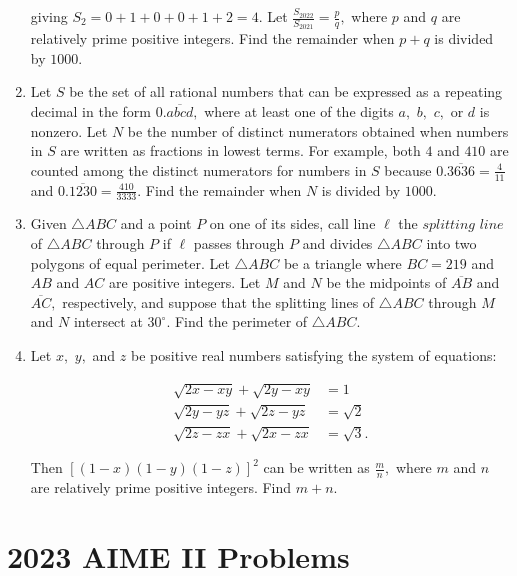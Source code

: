 \documentclass{article}
\begin{document}
\begin{enumerate}[label=\arabic*., itemsep=0.5em]
 giving \(S_2 = 0+1+0+0+1+2=4.\) Let \(\frac{S_{2022}}{S_{2021}} = \frac{p}{q},\) where \(p\) and \(q\) are relatively prime positive integers. Find the remainder when \(p+q\) is divided by \(1000.\)\par \vspace{0.5em}\item Let \(S\) be the set of all rational numbers that can be expressed as a repeating decimal in the form \(0.\overline{abcd},\) where at least one of the digits \(a,\) \(b,\) \(c,\) or \(d\) is nonzero. Let \(N\) be the number of distinct numerators obtained when numbers in \(S\) are written as fractions in lowest terms. For example, both \(4\) and \(410\) are counted among the distinct numerators for numbers in \(S\) because \(0.\overline{3636} = \frac{4}{11}\) and \(0.\overline{1230} = \frac{410}{3333}.\) Find the remainder when \(N\) is divided by \(1000.\)\par \vspace{0.5em}\item Given \(\triangle ABC\) and a point \(P\) on one of its sides, call line \(\ell\) the \(\textit{splitting line}\) of \(\triangle ABC\) through \(P\) if \(\ell\) passes through \(P\) and divides \(\triangle ABC\) into two polygons of equal perimeter. Let \(\triangle ABC\) be a triangle where \(BC = 219\) and \(AB\) and \(AC\) are positive integers. Let \(M\) and \(N\) be the midpoints of \(\overline{AB}\) and \(\overline{AC},\) respectively, and suppose that the splitting lines of \(\triangle ABC\) through \(M\) and \(N\) intersect at \(30^\circ.\) Find the perimeter of \(\triangle ABC.\)\par \vspace{0.5em}\item Let \(x,\) \(y,\) and \(z\) be positive real numbers satisfying the system of equations:

\begin{align*}
\sqrt{2x-xy} + \sqrt{2y-xy} &= 1 \\
\sqrt{2y-yz} + \sqrt{2z-yz} &= \sqrt2 \\
\sqrt{2z-zx} + \sqrt{2x-zx} &= \sqrt3.
\end{align*}
 
Then \(\left[ (1-x)(1-y)(1-z) \right]^2\) can be written as \(\frac{m}{n},\) where \(m\) and \(n\) are relatively prime positive integers. Find \(m+n.\)\par \vspace{0.5em}\end{enumerate}\newpage\section*{2023 AIME II Problems}
\end{document}
